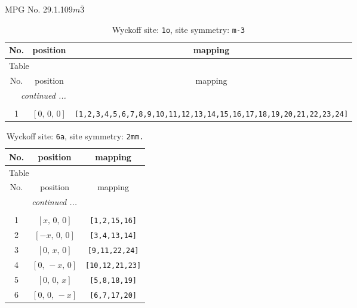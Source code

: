 \documentclass[fleqn,8pt]{jsarticle}
\begin{document}
\setcounter{MaxMatrixCols}{32}

\renewcommand{\tablename}{Table~}
\renewcommand{\figurename}{Figure~}
\begin{center}
\LARGE
MPG No. 29.1.109\quad$m\bar{3}$
\end{center}
\renewcommand{\arraystretch}{1.2}
\begin{longtable}{ccc}
\caption{Wyckoff site: {\tt 1o}, site symmetry: {\tt m-3}}
 \\
 \hline \hline
No. & position & mapping \\ \hline \endfirsthead

\multicolumn{2}{l}{\tablename\ \thetable{}} \\
 \hline \hline
No. & position & mapping \\ \hline \endhead

 \hline \hline
\multicolumn{2}{r}{\footnotesize\it continued ...} \\ \endfoot

 \hline \hline
\multicolumn{2}{r}{} \\ \endlastfoot

1 & $\left[ 0,\, 0,\, 0 \right]$ & {\tt [1,2,3,4,5,6,7,8,9,10,11,12,13,14,15,16,17,18,19,20,21,22,23,24]} \\
\end{longtable}
\renewcommand{\arraystretch}{1.2}
\begin{longtable}{ccc}
\caption{Wyckoff site: {\tt 6a}, site symmetry: {\tt 2mm.}}
 \\
 \hline \hline
No. & position & mapping \\ \hline \endfirsthead

\multicolumn{2}{l}{\tablename\ \thetable{}} \\
 \hline \hline
No. & position & mapping \\ \hline \endhead

 \hline \hline
\multicolumn{2}{r}{\footnotesize\it continued ...} \\ \endfoot

 \hline \hline
\multicolumn{2}{r}{} \\ \endlastfoot

1 & $\left[ x,\, 0,\, 0 \right]$ & {\tt [1,2,15,16]} \\ \hline
2 & $\left[ - x,\, 0,\, 0 \right]$ & {\tt [3,4,13,14]} \\ \hline
3 & $\left[ 0,\, x,\, 0 \right]$ & {\tt [9,11,22,24]} \\ \hline
4 & $\left[ 0,\, - x,\, 0 \right]$ & {\tt [10,12,21,23]} \\ \hline
5 & $\left[ 0,\, 0,\, x \right]$ & {\tt [5,8,18,19]} \\ \hline
6 & $\left[ 0,\, 0,\, - x \right]$ & {\tt [6,7,17,20]} \\
\end{longtable}
\end{document}
